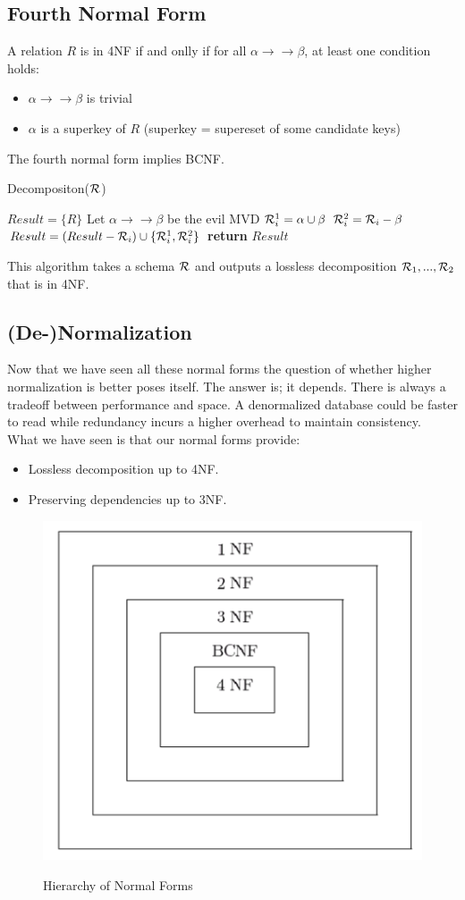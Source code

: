 \subsection{Fourth Normal Form}
A relation $R$ is in 4NF if and onlly if for all $\alpha \to\to\beta$, at least one condition holds:
\begin{itemize}
\item $\alpha \to\to \beta$ is trivial
\item $\alpha$ is a superkey of $R$ (superkey = supereset of some candidate keys)
\end{itemize}
The fourth normal form implies BCNF. 
\begin{algorithm}
\caption{Decompositon($\mathcal{R}$)}
\begin{algorithmic}
\State $Result = \{R\}$
	\State Let $\alpha \to\to \beta$ be the evil MVD
	\State $\mathcal{R}_i^1 = \alpha \cup \beta$
	\State $\mathcal{R}_i^2 = \mathcal{R}_i - \beta$
	\State $Result = (Result - \mathcal{R}_i) \cup \{\mathcal{R}_i^1, \mathcal{R}_i^2\}$
\EndWhile
\State \textbf{return} $Result$
\end{algorithmic}
\end{algorithm}
This algorithm takes a schema $\mathcal{R}$ and outputs a lossless decomposition $\mathcal{R}_1, ..., \mathcal{R}_2$ that is in 4NF.

\subsection{(De-)Normalization}
Now that we have seen all these normal forms the question of whether higher normalization is better poses itself. The answer is; it depends. There is always a tradeoff between performance and space. A denormalized database could be faster to read while redundancy incurs a higher overhead to maintain consistency.\\
What we have seen is that our normal forms provide:
\begin{itemize}
\item Lossless decomposition up to 4NF.
\item Preserving dependencies up to 3NF.
\end{itemize}
\begin{figure}[H]
\centering
\includegraphics[width=.3\textwidth]{images/normal-forms.PNG}
\label{normal_forms}
\caption{Hierarchy of Normal Forms}
\end{figure}


